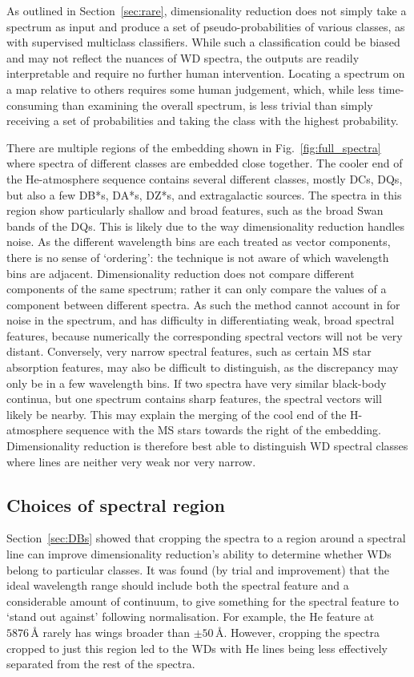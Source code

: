 \documentclass[fleqn,usenatbib]{mnras}
\begin{document}
As outlined in Section~\ref{sec:rare}, dimensionality reduction does not simply take a spectrum as input and produce a set of pseudo-probabilities of various classes, as with supervised multiclass classifiers.
While such a classification could be biased and may not reflect the nuances of WD spectra, the outputs are readily interpretable and require no further human intervention.
Locating a spectrum on a map relative to others requires some human judgement, which, while less time-consuming than examining the overall spectrum, is less trivial than simply receiving a set of probabilities and taking the class with the highest probability.

There are multiple regions of the embedding shown in Fig.~\ref{fig:full_spectra} where spectra of different classes are embedded close together.
The cooler end of the He-atmosphere sequence contains several different classes, mostly DCs, DQs, but also a few DB*s, DA*s, DZ*s, and extragalactic sources.
The spectra in this region show particularly shallow and broad features, such as the broad  Swan bands of the DQs.
This is likely due to the way dimensionality reduction handles noise.
As the different wavelength bins are each treated as vector components, there is no sense of `ordering': the technique is not aware of which wavelength bins are adjacent.
Dimensionality reduction does not compare different components of the same spectrum; rather it can only compare the values of a component between different spectra.
As such the method cannot account in for noise in the spectrum, and has difficulty in differentiating weak, broad spectral features, because numerically the corresponding spectral vectors will not be very distant.
Conversely, very narrow spectral features, such as certain MS star absorption features, may also be difficult to distinguish, as the discrepancy may only be in a few wavelength bins.
If two spectra have very similar black-body continua, but one spectrum contains sharp features, the spectral vectors will likely be nearby.
This may explain the merging of the cool end of the H-atmosphere sequence with the MS stars towards the right of the embedding.
Dimensionality reduction is therefore best able to distinguish WD spectral classes where lines are neither very weak nor very narrow.

\subsection{Choices of spectral region}

Section~\ref{sec:DBs} showed that cropping the spectra to a region around a spectral line can improve dimensionality reduction's ability to determine whether WDs belong to particular classes.
It was found (by trial and improvement) that the ideal wavelength range should include both the spectral feature and a considerable amount of continuum, to give something for the spectral feature to `stand out against' following normalisation.
For example, the He feature at $5876\,\text{\AA}$ rarely has wings broader than $\pm50\,\text{\AA}$.
However, cropping the spectra cropped to just this region led to the WDs with He lines being less effectively separated from the rest of the spectra.
\end{document}
